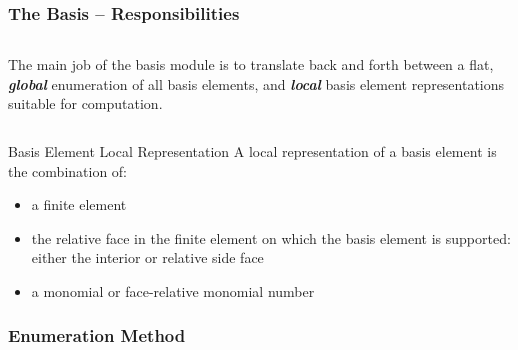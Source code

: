 \documentclass[compress]{beamer}
\begin{document}
\begin{frame}
  \frametitle{The Basis -- Responsibilities}
  \begin{columns}
    The main job of the basis module is to translate back and forth between a flat, \emph{\textbf{global}} enumeration
    of all basis elements, and \emph{\textbf{local}} basis element representations suitable for computation.
  \end{columns}
  \pause
  \begin{block}{Basis Element Local Representation}
    A local representation of a basis element is the combination of:
    \begin{itemize}[<+->]
      \item a finite element
      \item the relative face in the finite element on which the basis element is supported: either the interior or relative side face
      \item a monomial or face-relative monomial number
    \end{itemize}
  \end{block}
\end{frame}

\subsubsection{Enumeration Method}
\end{document}
